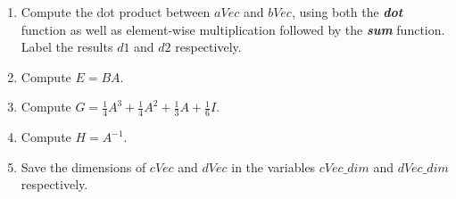 \documentclass[11pt]{article}
\newenvironment{qparts}{\begin{enumerate}[{(}a{)}]}{\end{enumerate}}
\begin{document}
\begin{qparts}

\item 
Compute the dot product between $aVec$ and $bVec$, using both the
\textbf{\textit{dot}} function as well as element-wise multiplication
followed by the \textbf{\textit{sum}} function.
Label the results $d1$ and $d2$ respectively.

\item
Compute $E = BA$.

\item
Compute 
$G = \frac{1}{4}A^3 + \frac{1}{4}A^2 + \frac{1}{3}A + \frac{1}{6}I$. 

\item
Compute $H = A^{-1}$.

\item
Save the dimensions of $cVec$ and $dVec$ in the variables $cVec\_dim$ and
$dVec\_dim$ respectively.

\end{qparts}
\end{document}
